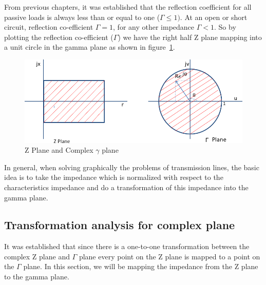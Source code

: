 From previous chapters, it was established that the reflection coefficient for all passive loads is always less than or equal to one ($\Gamma\leq 1)$. At an open or short circuit, reflection co-efficient $\Gamma = 1$, for any other impedance $\Gamma < 1$. So by plotting the reflection co-efficient ($\Gamma$) we have the right half Z plane mapping into a unit circle in the gamma plane as shown in figure~\ref{fig:oiuhgvcx}.
\begin{figure}[h]
\centering
\includegraphics[width=0.9\linewidth]{./graphics/oiuhgvcx}
\caption{Z Plane and Complex $\gamma$ plane}
\label{fig:oiuhgvcx}
\end{figure}

In general, when solving graphically the problems of transmission lines, the basic idea is to take the impedance which is normalized with respect to the characteristics impedance and do a transformation of this impedance into the gamma plane.

\subsection{Transformation analysis for complex plane}
It was established that since there is a one-to-one transformation between the complex Z plane and $\Gamma$ plane every point on the Z plane is mapped to a point on the $ \Gamma$ plane. In this section, we will be mapping the impedance from the Z plane to the gamma plane.

